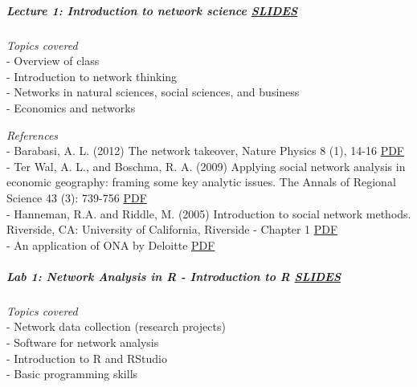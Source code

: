 \documentclass[
]{article}
\begin{document}
\hypertarget{lecture-1-introduction-to-network-science-slides}{%
\subparagraph{\texorpdfstring{\textbf{Lecture 1: Introduction to network
science}
\href{https://github.com/PABalland/PABalland.github.io/raw/master/teaching/on/L1\&Lab1.pdf}{SLIDES}}{Lecture 1: Introduction to network science SLIDES}}\label{lecture-1-introduction-to-network-science-slides}}

\emph{Topics covered}\\
- Overview of class\\
- Introduction to network thinking\\
- Networks in natural sciences, social sciences, and business\\
- Economics and networks

\emph{References}\\
- Barabasi, A. L. (2012) The network takeover, Nature Physics 8 (1),
14-16
\href{https://2c2e773f-85c0-4039-818c-ea517fc75085.filesusr.com/ugd/c5611b_c65333e3828c4a7a854f20ff09e4b127.pdf}{PDF}\\
- Ter Wal, A. L., and Boschma, R. A. (2009) Applying social network
analysis in economic geography: framing some key analytic issues. The
Annals of Regional Science 43 (3): 739-756
\href{https://2c2e773f-85c0-4039-818c-ea517fc75085.filesusr.com/ugd/c5611b_0931e6065e214ba1933018110703fae3.pdf}{PDF}\\
- Hanneman, R.A. and Riddle, M. (2005) Introduction to social network
methods. Riverside, CA: University of California, Riverside - Chapter 1
\href{http://faculty.ucr.edu/~hanneman/nettext/C1_Social_Network_Data.html}{PDF}\\
- An application of ONA by Deloitte
\href{https://www2.deloitte.com/us/en/pages/human-capital/articles/organizational-network-analysis.html}{PDF}

\hypertarget{lab-1-network-analysis-in-r---introduction-to-r-slides}{%
\subparagraph{\texorpdfstring{\textbf{Lab 1: Network Analysis in R -
Introduction to R}
\href{https://paballand.github.io/teaching/on/Lab1.html}{SLIDES}}{Lab 1: Network Analysis in R - Introduction to R SLIDES}}\label{lab-1-network-analysis-in-r---introduction-to-r-slides}}

\emph{Topics covered}\\
- Network data collection (research projects)\\
- Software for network analysis\\
- Introduction to R and RStudio\\
- Basic programming skills
\end{document}
